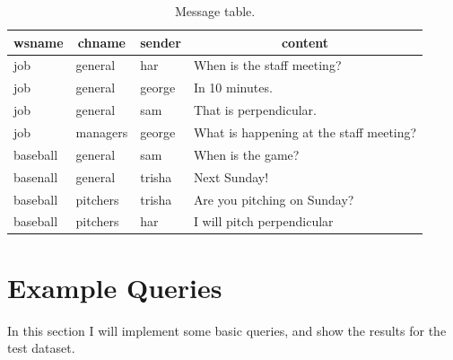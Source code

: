 \documentclass{article}
\begin{document}
\begin{table}[!p]
\centering
\begin{tabular}{l l l l}
\toprule
\multicolumn{1}{c}{wsname} &
\multicolumn{1}{c}{chname} &
\multicolumn{1}{c}{sender} &
\multicolumn{1}{c}{content} \\
\midrule
job & general & har & When is the staff meeting? \\
job & general & george & In 10 minutes. \\
job & general & sam  & That is perpendicular. \\
\midrule
job & managers & george  & What is happening at the staff meeting? \\
\midrule
baseball & general & sam & When is the game? \\
basenall & general & trisha & Next Sunday! \\
\midrule
baseball & pitchers & trisha & Are you pitching on Sunday? \\
baseball & pitchers & har & I will pitch perpendicular \\
\bottomrule
\end{tabular}
\caption{Message table.}
\label{tbl:message}
\end{table}

\section{Example Queries}

In this section I will implement some basic queries, and show the results for the test dataset.
\end{document}
